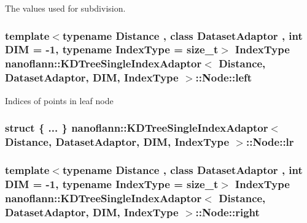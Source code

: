The values used for subdivision. \hypertarget{structnanoflann_1_1_k_d_tree_single_index_adaptor_1_1_node_a2862f49510dade7930a7208859106715}{
\subsubsection[{left}]{\setlength{\rightskip}{0pt plus 5cm}template$<$typename Distance , class Dataset\-Adaptor , int D\-I\-M = -\/1, typename Index\-Type  = size\-\_\-t$>$ Index\-Type {\bf nanoflann\-::\-K\-D\-Tree\-Single\-Index\-Adaptor}$<$ Distance, Dataset\-Adaptor, D\-I\-M, Index\-Type $>$\-::Node\-::left}}\label{structnanoflann_1_1_k_d_tree_single_index_adaptor_1_1_node_a2862f49510dade7930a7208859106715}
Indices of points in leaf node \hypertarget{structnanoflann_1_1_k_d_tree_single_index_adaptor_1_1_node_a1ca184a6aa811fecd9ec6931616c3a5b}{
\subsubsection[{lr}]{\setlength{\rightskip}{0pt plus 5cm}struct \{ ... \}   {\bf nanoflann\-::\-K\-D\-Tree\-Single\-Index\-Adaptor}$<$ Distance, Dataset\-Adaptor, D\-I\-M, Index\-Type $>$\-::Node\-::lr}}\label{structnanoflann_1_1_k_d_tree_single_index_adaptor_1_1_node_a1ca184a6aa811fecd9ec6931616c3a5b}
\hypertarget{structnanoflann_1_1_k_d_tree_single_index_adaptor_1_1_node_aa3f1d36e90cb8e4f076fac83388a4215}{
\subsubsection[{right}]{\setlength{\rightskip}{0pt plus 5cm}template$<$typename Distance , class Dataset\-Adaptor , int D\-I\-M = -\/1, typename Index\-Type  = size\-\_\-t$>$ Index\-Type {\bf nanoflann\-::\-K\-D\-Tree\-Single\-Index\-Adaptor}$<$ Distance, Dataset\-Adaptor, D\-I\-M, Index\-Type $>$\-::Node\-::right}}\label{structnanoflann_1_1_k_d_tree_single_index_adaptor_1_1_node_aa3f1d36e90cb8e4f076fac83388a4215}
